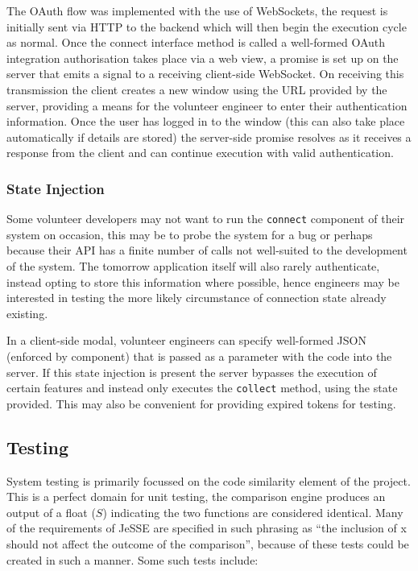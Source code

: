 \documentclass[jou,apacite]{apa6}
\begin{document}
The OAuth flow was implemented with the use of WebSockets, the request is initially sent via HTTP to the backend which will then begin the execution cycle as normal. Once the connect interface method is called a well-formed OAuth integration authorisation takes place via a web view,  a promise is set up on the server that emits a signal to a receiving client-side WebSocket. On receiving this transmission the client creates a new window using the URL provided by the server, providing a means for the volunteer engineer to enter their authentication information. Once the user has logged in to the window (this can also take place automatically if details are stored) the server-side promise resolves as it receives a response from the client and can continue execution with valid authentication.

\subsubsection{State Injection}
Some volunteer developers may not want to run the \texttt{connect} component of their system on occasion, this may be to probe the system for a bug or perhaps because their API has a finite number of calls not well-suited to the development of the system. The tomorrow application itself will also rarely authenticate, instead opting to store this information where possible, hence engineers may be interested in testing the more likely circumstance of connection state already existing. 

In a client-side modal, volunteer engineers can specify well-formed JSON (enforced by component) that is passed as a parameter with the code into the server. If this state injection is present the server bypasses the execution of certain features and instead only executes the \texttt{collect} method, using the state provided. This may also be convenient for providing expired tokens for testing.

\subsection{Testing}
System testing is primarily focussed on the code similarity element of the project. This is a perfect domain for unit testing, the comparison engine produces an output of a float ($S$) indicating the two functions are considered identical. Many of the requirements of JeSSE are specified in such phrasing as “the inclusion of x should not affect the outcome of the comparison”, because of these tests could be created in such a manner. Some such tests include:
\end{document}

